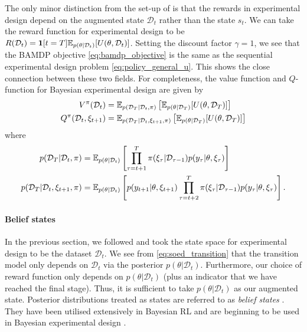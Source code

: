 \documentclass[a4paper, 10pt]{report}
\theoremstyle{plain}
\begin{document}
	The only minor distinction from the set-up of \citet{guez2012efficient} is that the rewards in experimental design depend on the augmented state $\mathcal{D}_t$ rather than the state $s_t$. We can take the reward function for experimental design to be $R(\mathcal{D}_t) = \bm{1}[t = T]  \mathbb{E}_{p(\theta|\mathcal{D}_t)}[U(\theta,\mathcal{D}_t)]$.
	Setting the discount factor $\gamma=1$, we see that the BAMDP objective \eqref{eq:bamdp_objective} is the same as the sequential experimental design problem \eqref{eq:policy_general_u}.
	This shows the close connection between these two fields.
	For completeness, the value function and $Q$-function \citep{szepesvari2010algorithms} for Bayesian experimental design are given by
	\begin{align}
	V^\pi(\mathcal{D}_t) &= \mathbb{E}_{p(\mathcal{D}_T|\mathcal{D}_t,\pi)}\left[ \mathbb{E}_{p(\theta|\mathcal{D}_T)} [U(\theta,\mathcal{D}_T)] \right]   \\
	Q^\pi(\mathcal{D}_t,\xi_{t+1}) &= \mathbb{E}_{p(\mathcal{D}_T|\mathcal{D}_t,\xi_{t+1},\pi)}\left[ \mathbb{E}_{p(\theta|\mathcal{D}_T)} [U(\theta,\mathcal{D}_T)] \right]
	\end{align}
	where 
	\begin{align}
	p(\mathcal{D}_T|\mathcal{D}_t,\pi) &= \mathbb{E}_{p(\theta|\mathcal{D}_t)}\left[ \prod_{\tau=t+1}^T \pi(\xi_{\tau}|\mathcal{D}_{\tau-1})p(y_{\tau}|\theta,\xi_{\tau}) \right] \\
	p(\mathcal{D}_T|\mathcal{D}_t,\xi_{t+1},\pi) &= \mathbb{E}_{p(\theta|\mathcal{D}_t)}\left[ p(y_{t+1}|\theta,\xi_{t+1}) \prod_{\tau=t+2}^T \pi(\xi_{\tau}|\mathcal{D}_{\tau-1})p(y_{\tau}|\theta,\xi_{\tau}) \right].
	\end{align}
	
	\paragraph{Belief states}
	In the previous section, we followed \citet{guez2012efficient} and took the state space for experimental design to be the dataset $\mathcal{D}_t$.
	We see from \eqref{eq:soed_transition} that the transition model only depends on $\mathcal{D}_t$ via the posterior $p(\theta|\mathcal{D}_t)$.
	Furthermore, our choice of reward function only depends on $p(\theta|\mathcal{D}_t)$ (plus an indicator that we have reached the final stage).
	Thus, it is sufficient to take $p(\theta|\mathcal{D}_t)$ as our augmented state. 
	Posterior distributions treated as states are referred to as \emph{belief states} \citep{igl2018deep}.
	They have been utilised extensively in Bayesian RL \citep{igl2018deep,zintgraf2019varibad,ghavamzadeh2016bayesian} and are beginning to be used in Bayesian experimental design \citep{huan2016sequential}.
	
\end{document}
